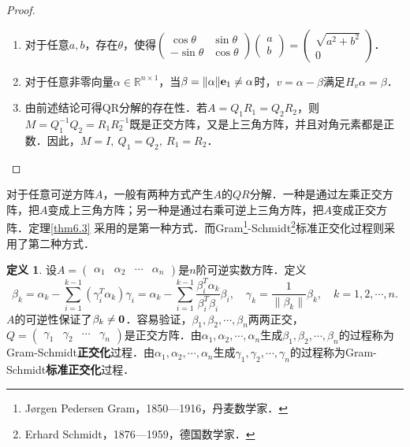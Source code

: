 \documentclass[a4paper,fontset=windows]{ctexbook}
\theoremstyle{definition}
\newtheorem{definition}{定义}[chapter]
\begin{document}
\begin{proof}~
\begin{enumerate}
\item 对于任意$a,b$，存在$\theta$，使得$\begin{pmatrix}\cos\theta&\sin\theta \\ -\sin\theta&\cos\theta\end{pmatrix}\begin{pmatrix}a \\ b\end{pmatrix}=\begin{pmatrix}\sqrt{a^2+b^2} \\ 0\end{pmatrix}$．

\item 对于任意非零向量$\alpha\in\mathbb{R}^{n\times 1}$，当$\beta=\|\alpha\|{\bf e}_1\ne\alpha$时，$v=\alpha-\beta$满足$H_v\alpha=\beta$．

\item 由前述结论可得QR分解的存在性．若$A=Q_1R_1=Q_2R_2$，则$M=Q_1^{-1}Q_2=R_1R_2^{-1}$既是正交方阵，又是上三角方阵，并且对角元素都是正数．因此，$M=I,~Q_1=Q_2,~R_1=R_2$．\qedhere
\end{enumerate}
\end{proof}

对于任意可逆方阵$A$，一般有两种方式产生$A$的$QR$分解．一种是通过左乘正交方阵，把$A$变成上三角方阵；另一种是通过右乘可逆上三角方阵，把$A$变成正交方阵．定理\ref{thm6.3} 采用的是第一种方式．而Gram\footnote{J{\o}rgen Pedersen Gram，1850—1916，丹麦数学家．}-Schmidt\footnote{Erhard Schmidt，1876—1959，德国数学家．}标准正交化过程则采用了第二种方式．

\begin{definition}\label{def6.2}
设$A=\begin{pmatrix}\alpha_1&\alpha_2&\cdots&\alpha_n\end{pmatrix}$是$n$阶可逆实数方阵．定义
\begin{equation}\label{eq6.1}
\beta_k=\alpha_k-\sum_{i=1}^{k-1}(\gamma_i^T\alpha_k)\gamma_i=\alpha_k-\sum_{i=1}^{k-1}\frac{\beta_i^T\alpha_k}{\beta_i^T\beta_i}\beta_i,\quad\gamma_k=\frac{1}{\|\beta_k\|}\beta_k,\quad k=1,2,\cdots,n.
\end{equation}
$A$的可逆性保证了$\beta_k\ne {\bf 0}$．容易验证，$\beta_1,\beta_2,\cdots,\beta_n$两两正交，$Q=\begin{pmatrix}\gamma_1&\gamma_2&\cdots&\gamma_n\end{pmatrix}$是正交方阵．由$\alpha_1,\alpha_2,\cdots,\alpha_n$生成$\beta_1,\beta_2,\cdots,\beta_n$的过程称为Gram-Schmidt{\bf 正交化}过程．由$\alpha_1,\alpha_2,\cdots,\alpha_n$生成$\gamma_1,\gamma_2,\cdots,\gamma_n$的过程称为Gram-Schmidt{\bf 标准正交化}过程．
\end{definition}
\end{document}
